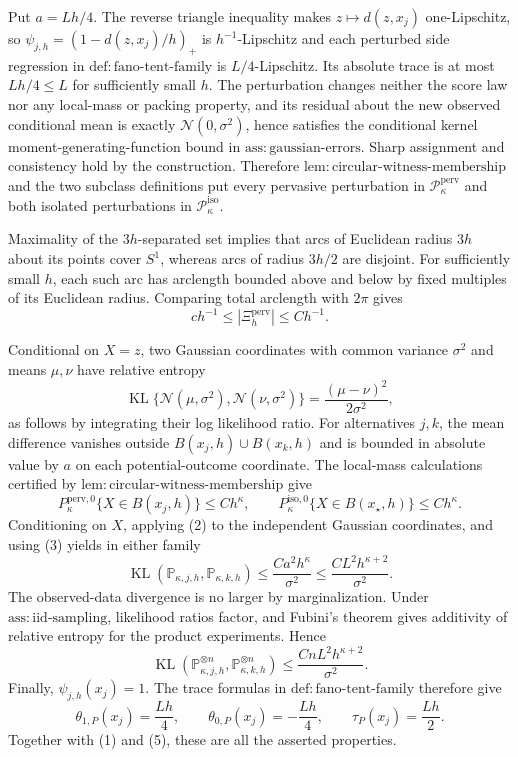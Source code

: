 Put \(a=Lh/4\).  The reverse triangle inequality makes \(z\mapsto d(z,x_j)\) one-Lipschitz, so \(\psi_{j,h}=(1-d(z,x_j)/h)_+\) is \(h^{-1}\)-Lipschitz and each perturbed side regression in \(\mathrm{def:fano\text{-}tent\text{-}family}\) is \(L/4\)-Lipschitz.  Its absolute trace is at most \(Lh/4\le L\) for sufficiently small \(h\).  The perturbation changes neither the score law nor any local-mass or packing property, and its residual about the new observed conditional mean is exactly \(\mathcal N(0,\sigma^2)\), hence satisfies the conditional kernel moment-generating-function bound in \(\mathrm{ass:gaussian\text{-}errors}\).  Sharp assignment and consistency hold by the construction.  Therefore \(\mathrm{lem:circular\text{-}witness\text{-}membership}\) and the two subclass definitions put every pervasive perturbation in \(\mathcal P_{\kappa}^{\mathrm{perv}}\) and both isolated perturbations in \(\mathcal P_{\kappa}^{\mathrm{iso}}\).

Maximality of the \(3h\)-separated set implies that arcs of Euclidean radius \(3h\) about its points cover \(S^1\), whereas arcs of radius \(3h/2\) are disjoint.  For sufficiently small \(h\), each such arc has arclength bounded above and below by fixed multiples of its Euclidean radius.  Comparing total arclength with \(2\pi\) gives
\[
 c h^{-1}\le |\Xi_h^{\mathrm{perv}}|\le C h^{-1}. \tag{1}
\]

Conditional on \(X=z\), two Gaussian coordinates with common variance \(\sigma^2\) and means \(\mu,\nu\) have relative entropy
\[
 \operatorname{KL}\{\mathcal N(\mu,\sigma^2),\mathcal N(\nu,\sigma^2)\}
 =\frac{(\mu-\nu)^2}{2\sigma^2}, \tag{2}
\]
as follows by integrating their log likelihood ratio.  For alternatives \(j,k\), the mean difference vanishes outside \(B(x_j,h)\cup B(x_k,h)\) and is bounded in absolute value by \(a\) on each potential-outcome coordinate.  The local-mass calculations certified by \(\mathrm{lem:circular\text{-}witness\text{-}membership}\) give
\[
 P_{\kappa}^{\mathrm{perv},0}\{X\in B(x_j,h)\}\le Ch^\kappa,
 \qquad
 P_{\kappa}^{\mathrm{iso},0}\{X\in B(x_{\star},h)\}\le Ch^\kappa. \tag{3}
\]
Conditioning on \(X\), applying (2) to the independent Gaussian coordinates, and using (3) yields in either family
\[
 \operatorname{KL}(\mathbb P_{\kappa,j,h},\mathbb P_{\kappa,k,h})
 \le \frac{Ca^2h^\kappa}{\sigma^2}
 \le \frac{CL^2h^{\kappa+2}}{\sigma^2}. \tag{4}
\]
The observed-data divergence is no larger by marginalization.  Under \(\mathrm{ass:iid\text{-}sampling}\), likelihood ratios factor, and Fubini's theorem gives additivity of relative entropy for the product experiments.  Hence
\[
 \operatorname{KL}(\mathbb P_{\kappa,j,h}^{\otimes n},
 \mathbb P_{\kappa,k,h}^{\otimes n})
 \le \frac{CnL^2h^{\kappa+2}}{\sigma^2}. \tag{5}
\]
Finally, \(\psi_{j,h}(x_j)=1\).  The trace formulas in \(\mathrm{def:fano\text{-}tent\text{-}family}\) therefore give
\[
 \theta_{1,P}(x_j)=\frac{Lh}{4},\qquad
 \theta_{0,P}(x_j)=-\frac{Lh}{4},\qquad
 \tau_P(x_j)=\frac{Lh}{2}.
\]
Together with (1) and (5), these are all the asserted properties.